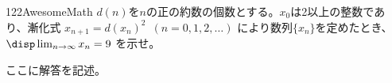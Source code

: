 \begin{prob}{122}{}{AwesomeMath}
 $d(n)$を$n$の正の約数の個数とする。$x_0$は2以上の整数であり、漸化式 $x_{n+1}=d(x_n)^2$~$(n=0, 1, 2, \ldots)$ により数列$\{x_n\}$を定めたとき、$\disp \lim_{n\to\infty} x_n = 9$ を示せ。
\end{prob}
ここに解答を記述。